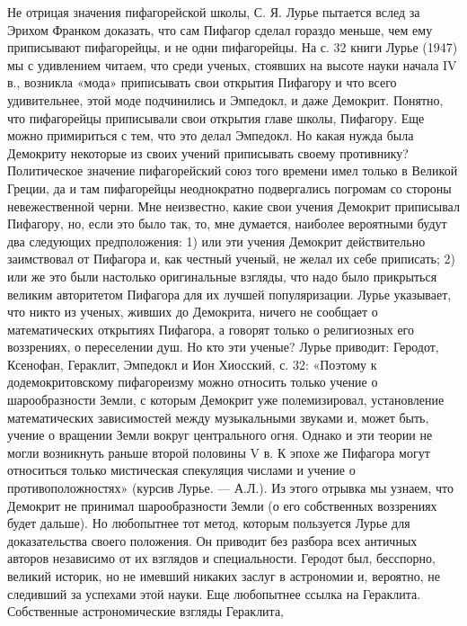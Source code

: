 Не отрицая значения пифагорейской школы, С. Я. Лурье пытается вслед за
Эрихом Франком  доказать, что сам  Пифагор сделал гораздо  меньше, чем
ему приписывают  пифагорейцы, и  не одни пифагорейцы.  На с.  32 книги
Лурье (1947)  мы с  удивлением читаем, что  среди ученых,  стоявших на
высоте науки начала  IV в., возникла «мода»  приписывать свои открытия
Пифагору и что всего удивительнее, этой моде подчинились и Эмпедокл, и
даже  Демокрит. Понятно,  что  пифагорейцы  приписывали свои  открытия
главе  школы, Пифагору.  Еще можно  примириться с  тем, что  это делал
Эмпедокл.  Но какая  нужда была  Демокриту некоторые  из своих  учений
приписывать  своему  противнику? Политическое  значение  пифагорейский
союз того времени  имел только в Великой Греции, да  и там пифагорейцы
неоднократно  подвергались погромам  со стороны  невежественной черни.
Мне неизвестно,  какие свои  учения Демокрит приписывал  Пифагору, но,
если это  было так,  то, мне думается,  наиболее вероятными  будут два
следующих  предположения: 1)  или  эти  учения Демокрит  действительно
заимствовал  от Пифагора  и,  как  честный ученый,  не  желал их  себе
приписать;  2) или  же это  были настолько  оригинальные взгляды,  что
надо  было  прикрыться  великим  авторитетом Пифагора  для  их  лучшей
популяризации.  Лурье  указывает,  что  никто  из  ученых,  живших  до
Демокрита, ничего  не сообщает о математических  открытиях Пифагора, а
говорят только о религиозных его воззрениях, о переселении душ. Но кто
эти ученые?  Лурье приводит:  Геродот, Ксенофан, Гераклит,  Эмпедокл и
Ион Хиосский,  с. 32: «Поэтому к  додемокритовскому пифагореизму можно
относить  только учение  о  шарообразности Земли,  с которым  Демокрит
уже  полемизировал,  установление  математических  зависимостей  между
музыкальными звуками  и, может  быть, учение  о вращении  Земли вокруг
центрального  огня. Однако  и эти  теории не  могли возникнуть  раньше
второй  половины V  в. К  эпохе  же Пифагора  могут относиться  только
мистическая спекуляция числами и  учение о противоположностях» (курсив
Лурье.  ---  А.Л.).  Из  этого  отрывка мы  узнаем,  что  Демокрит  не
принимал  шарообразности Земли  (о  его  собственных воззрениях  будет
дальше).  Но  любопытнее  тот  метод,  которым  пользуется  Лурье  для
доказательства своего положения. Он приводит без разбора всех античных
авторов  независимо  от  их  взглядов и  специальности.  Геродот  был,
бесспорно, великий историк, но не  имевший никаких заслуг в астрономии
и,  вероятно, не  следивший  за успехами  этой  науки. Еще  любопытнее
ссылка  на Гераклита.  Собственные астрономические  взгляды Гераклита,
